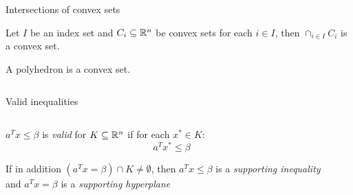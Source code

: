 \begin{frame}{Intersections of convex sets}
\begin{lemma}
  \label{lem:1}
  Let $I$ be an index set and $C_i \subseteq \mathbb{R}^n$ be convex sets for
  each $i \in I$, then $\cap_{i \in I}C_i$ is a convex set.
\end{lemma}

\begin{corollary}
  A polyhedron is a convex set.  
\end{corollary}


\end{frame}





\begin{frame}{}

  \begin{columns}
    \begin{column}{.5\textwidth}
      
    \end{column}
    \begin{column}{.5\textwidth}
      
    \end{column}       
  \end{columns}
\end{frame}




\begin{frame}{Valid inequalities}


 



  \begin{columns}
    \begin{column}{.5\textwidth}
       \begin{definition}
    $a^Tx \leq \beta$ is \emph{valid} for $K \subseteq \mathbb{R}^n$ if for each $x^* \in K$:   $$a^Tx^* \leq \beta$$


    If in addition $(a^Tx = β) \cap K \neq\emptyset$, then
    $a^Tx\leq β$ is a \emph{supporting inequality} and $a^Tx = β$ is a
    \emph{supporting hyperplane}
\end{definition}

    \end{column}
    \begin{column}{.5\textwidth}
      
    \end{column}       
  \end{columns}
\end{frame}




